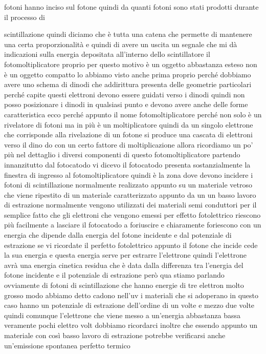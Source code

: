 fotoni hanno inciso sul fotone quindi da quanti fotoni sono stati prodotti durante il processo di 

scintillazione quindi diciamo che è tutta una catena che permette di mantenere una certa proporzionalità e quindi di avere un uscita un segnale che mi dà indicazioni sulla energia depositata all'interno dello scintillatore il fotomoltiplicatore proprio per questo motivo è un oggetto abbastanza esteso non è un oggetto compatto lo abbiamo visto anche prima proprio perché dobbiamo avere uno schema di dinodi che addirittura presenta delle geometrie particolari perché capite questi elettroni devono essere guidati verso i dinodi quindi non posso posizionare i dinodi in qualsiasi punto e devono avere anche delle forme caratteristica ecco perché appunto il nome fotomoltiplicatore perché non solo è un rivelatore di fotoni ma in più è un moltiplicatore quindi da un singolo elettrone che corrisponde alla rivelazione di un fotone si produce una cascata di elettroni verso il dino do con un certo fattore di moltiplicazione allora ricordiamo un po' più nel dettaglio i diversi componenti di questo fotomoltiplicatore partendo innanzitutto dal fotocatodo vi dicevo il fotocatodo presenta sostanzialmente la finestra di ingresso al fotomoltiplicatore quindi è la zona dove devono incidere i fotoni di scintillazione normalmente realizzato appunto su un materiale vetroso che viene ripestito di un materiale caratterizzato appunto da un un basso lavoro di estrazione normalmente vengono utilizzati dei materiali semi conduttori per il semplice fatto che gli elettroni che vengono emessi per effetto fotolettrico riescono più facilmente a lasciare il fotocatodo a foriuscire e chiaramente foriescono con un energia che dipende dalla energia del fotone incidente e dal potenziale di estrazione se vi ricordate il perfetto fotolettrico appunto il fotone che incide cede la sua energia e questa energia serve per estrarre l'elettrone quindi l'elettrone avrà una energia cinetica residua che è data dalla differenza tra l'energia del fotone incidente e il potenziale di estrazione però qua stiamo parlando ovviamente di fotoni di scintillazione che hanno energie di tre elettron molto grosso modo abbiamo detto cadono nell'uv i materiali che si adoperano in questo caso hanno un potenziale di estrazione dell'ordine di un volte e mezzo due volte quindi comunque l'elettrone che viene messo a un'energia abbastanza bassa veramente pochi elettro volt dobbiamo ricordarci inoltre che essendo appunto un materiale con così basso lavoro di estrazione potrebbe verificarsi anche un'emissione spontanea perfetto termico

